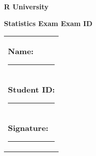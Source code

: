 \documentclass[10pt,a4paper]{article}
\makeatletter
\newcommand{\myID}{\@ID}
\newcommand{\myDate}{\@Date}
\makeatother
\begin{document}
\thispagestyle{empty}
{\sf
\textbf{\LARGE{R University}}

\textbf{\large{Statistics Exam \myDate \hfill Exam ID \myID}}

\vspace*{2cm}

\begin{tabular}{p{14cm}}
\textbf{Name:} \hrule \\[1.5cm]
\textbf{Student ID:} \hrule \\[1.5cm]
\textbf{Signature:} \hrule  \\[1.5cm]
\end{tabular}

\vspace*{1cm}

}
\newpage

\begin{enumerate}


\end{enumerate}
\end{document}
